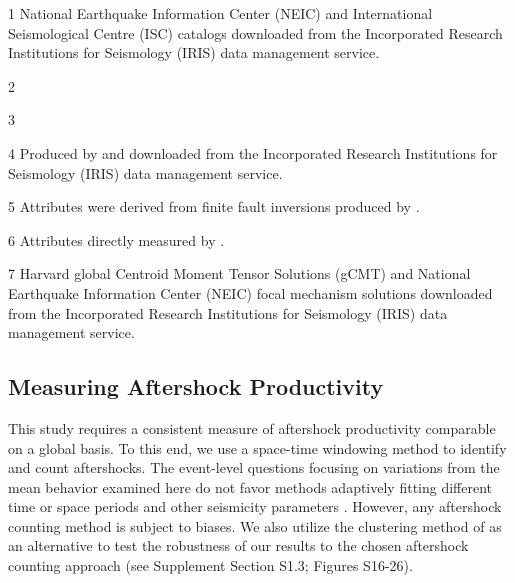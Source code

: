 \documentclass[draft, jgrga]{agujournal2018}
\begin{document}
\begin{table}[]
\begin{threeparttable}
    \begin{tablenotes}
        \item[1] National Earthquake Information Center (NEIC) and International Seismological Centre (ISC) catalogs downloaded from the Incorporated Research Institutions for Seismology (IRIS) data management service.
        \item[2] \citet{Bird2003AnBoundaries}
        \item[3] \citet{Muller2008}
        \item[4] Produced by \citet{Convers2011GlobalMid2010} and downloaded from the Incorporated Research Institutions for Seismology (IRIS) data management service.
        \item[5] Attributes were derived from finite fault inversions produced by \citet{Hayes2017}.
        \item[6] Attributes directly measured by \citet{Hayes2017}.
        \item[7] Harvard global Centroid Moment Tensor Solutions (gCMT) and National Earthquake Information Center (NEIC) focal mechanism solutions downloaded from the Incorporated Research Institutions for Seismology (IRIS) data management service.

    \end{tablenotes}

\end{threeparttable}

\end{table}



    \subsection{Measuring Aftershock Productivity}

This study requires a consistent measure of aftershock productivity comparable on a global basis. To this end, we use a space-time windowing method to identify and count aftershocks. The event-level questions focusing on variations from the mean behavior examined here do not favor methods adaptively fitting different time or space periods and other seismicity parameters \citep[e.g.][]{ogata2017statistics}. However, any aftershock counting method is subject to biases. We also utilize the clustering method of \citet{Zaliapin2008} as an alternative to test the robustness of our results to the chosen aftershock counting approach (see Supplement Section S1.3; Figures S16-26).
\end{document}
